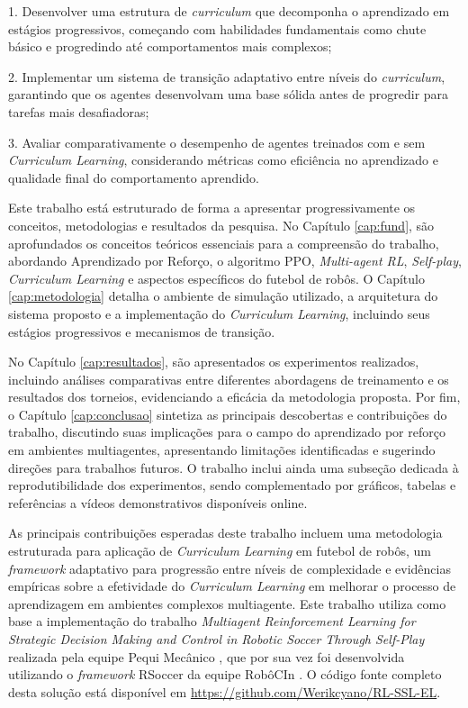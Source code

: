 1. Desenvolver uma estrutura de \textit{curriculum} que decomponha o aprendizado em estágios progressivos, começando com habilidades fundamentais como chute básico e progredindo até comportamentos mais complexos;

2. Implementar um sistema de transição adaptativo entre níveis do \textit{curriculum}, garantindo que os agentes desenvolvam uma base sólida antes de progredir para tarefas mais desafiadoras;

3. Avaliar comparativamente o desempenho de agentes treinados com e sem \textit{Curriculum Learning}, considerando métricas como eficiência no aprendizado e qualidade final do comportamento aprendido.

Este trabalho está estruturado de forma a apresentar progressivamente os conceitos, metodologias e resultados da pesquisa. No Capítulo \ref{cap:fund}, são aprofundados os conceitos teóricos essenciais para a compreensão do trabalho, abordando Aprendizado por Reforço, o algoritmo PPO, \textit{Multi-agent RL}, \textit{Self-play}, \textit{Curriculum Learning} e aspectos específicos do futebol de robôs. O Capítulo \ref{cap:metodologia} detalha o ambiente de simulação utilizado, a arquitetura do sistema proposto e a implementação do \textit{Curriculum Learning}, incluindo seus estágios progressivos e mecanismos de transição.

No Capítulo \ref{cap:resultados}, são apresentados os experimentos realizados, incluindo análises comparativas entre diferentes abordagens de treinamento e os resultados dos torneios, evidenciando a eficácia da metodologia proposta. Por fim, o Capítulo \ref{cap:conclusao} sintetiza as principais descobertas e contribuições do trabalho, discutindo suas implicações para o campo do aprendizado por reforço em ambientes multiagentes, apresentando limitações identificadas e sugerindo direções para trabalhos futuros. O trabalho inclui ainda uma subseção dedicada à reprodutibilidade dos experimentos, sendo complementado por gráficos, tabelas e referências a vídeos demonstrativos disponíveis online.

As principais contribuições esperadas deste trabalho incluem uma metodologia estruturada para aplicação de \textit{Curriculum Learning} em futebol de robôs, um \textit{framework} adaptativo para progressão entre níveis de complexidade e evidências empíricas sobre a efetividade do \textit{Curriculum Learning} em melhorar o processo de aprendizagem em ambientes complexos multiagente. Este trabalho utiliza como base a implementação \cite{framework_pequi_rSoccer} do trabalho \textit{Multiagent Reinforcement Learning for Strategic Decision Making and Control in Robotic Soccer Through Self-Play} \cite{bruno_brandao} realizada pela equipe Pequi Mecânico \cite{pequi_mecanico}, que por sua vez foi desenvolvida utilizando o \textit{framework} RSoccer \cite{rSoccer} da equipe RobôCIn \cite{robocin}. O código fonte completo desta solução está disponível em \url{https://github.com/Werikcyano/RL-SSL-EL}.

